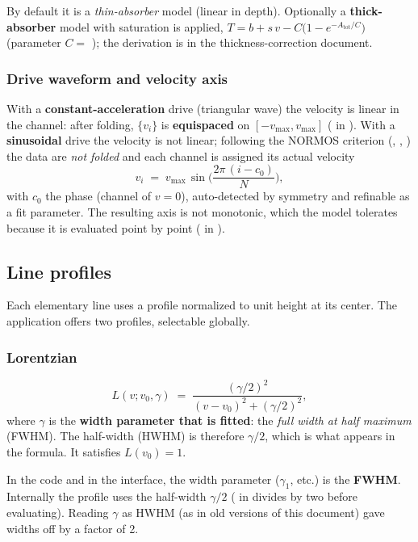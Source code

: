 By default it is a \emph{thin-absorber} model (linear in depth). Optionally a
\textbf{thick-absorber} model with saturation is applied,
$T = b + s\,v - C\bigl(1-e^{-A_{\text{tot}}/C}\bigr)$ (parameter $C=$
); the derivation is in the thickness-correction document.

\subsubsection{Drive waveform and velocity axis}\label{sec:drive}
With a \textbf{constant-acceleration} drive (triangular wave) the velocity is
linear in the channel: after folding, $\{v_i\}$ is \textbf{equispaced} on
$[-v_{\max},v_{\max}]$ ( in ). With a
\textbf{sinusoidal} drive the velocity is not linear; following the NORMOS
criterion (, , ) the
data are \emph{not folded} and each channel is assigned its actual velocity
\begin{equation}
  v_i \;=\; v_{\max}\,\sin\!\Big(\frac{2\pi\,(i-c_0)}{N}\Big),
\end{equation}
with $c_0$ the phase (channel of $v=0$), auto-detected by symmetry and refinable as
a fit parameter. The resulting axis is not monotonic, which the model tolerates
because it is evaluated point by point ( in ).

\subsection{Line profiles}\label{sec:lineshape}

Each elementary line uses a profile normalized to unit height at its center. The
application offers two profiles, selectable globally.

\subsubsection{Lorentzian}
\begin{equation}
  L(v;v_0,\gamma) \;=\; \frac{(\gamma/2)^{2}}{(v-v_0)^{2}+(\gamma/2)^{2}},
  \label{eq:lorentz}
\end{equation}
where $\gamma$ is the \textbf{width parameter that is fitted}: the \emph{full width
at half maximum} (FWHM). The half-width (HWHM) is therefore $\gamma/2$, which is
what appears in the formula. It satisfies $L(v_0)=1$.

\begin{nota}
In the code and in the interface, the width parameter ($\gamma_1$, etc.) is the
\textbf{FWHM}. Internally the profile uses the half-width $\gamma/2$
( in  divides by two before evaluating).
Reading $\gamma$ as HWHM (as in old versions of this document) gave widths off by a
factor of 2.
\end{nota}


